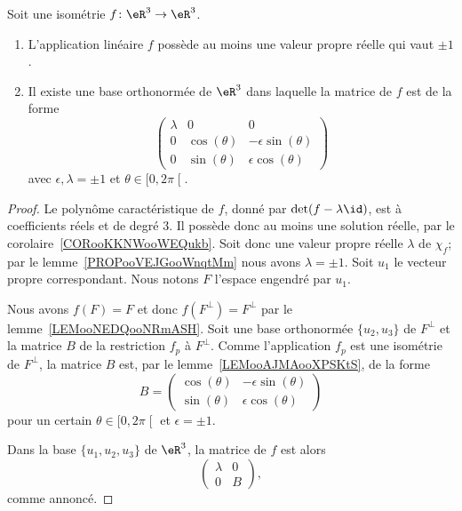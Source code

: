 \begin{proposition}      \label{PROPooOMORooWzsrDB}
	Soit une isométrie \( f\colon \eR^3\to \eR^3\).
	\begin{enumerate}
		\item
		      L'application linéaire \( f\) possède au moins une valeur propre réelle qui vaut \( \pm 1\).
		\item
		      Il existe une base orthonormée de \( \eR^3\) dans laquelle la matrice de \( f\) est de la forme
		      \begin{equation}
			      \begin{pmatrix}
				      \lambda & 0            & 0                     \\
				      0       & \cos(\theta) & -\epsilon\sin(\theta) \\
				      0       & \sin(\theta) & \epsilon\cos(\theta)
			      \end{pmatrix}
		      \end{equation}
		      avec \( \epsilon,\lambda=\pm 1\) et \( \theta\in \mathopen[ 0 , 2\pi \mathclose[\).
	\end{enumerate}
\end{proposition}

\begin{proof}
	Le polynôme caractéristique de \( f\), donné par \( \det(f-\lambda\id)\), est à coefficients réels et de degré \( 3\). Il possède donc au moins une solution réelle, par le corolaire~\ref{CORooKKNWooWEQukb}. Soit donc une valeur propre réelle \( \lambda\) de \( \chi_f\); par le lemme~\ref{PROPooVEJGooWnqtMm} nous avons \( \lambda=\pm 1\). Soit \( u_1\) le vecteur propre correspondant. Nous notons \( F\) l'espace engendré par \( u_1\).

	Nous avons \( f(F)=F\) et donc \( f(F^{\perp})=F^{\perp}\) par le lemme~\ref{LEMooNEDQooNRmASH}. Soit une base orthonormée \( \{ u_2,u_3 \}\) de \( F^{\perp}\) et la matrice \( B\) de la restriction \( f_{p}\) à \( F^{\perp}\). Comme l'application \( f_p\) est une isométrie de \( F^{\perp}\), la matrice \( B\) est, par le lemme~\ref{LEMooAJMAooXPSKtS}, de la forme
	\begin{equation}
		B=\begin{pmatrix}
			\cos(\theta) & -\epsilon\sin(\theta) \\
			\sin(\theta) & \epsilon\cos(\theta)
		\end{pmatrix}
	\end{equation}
	pour un certain \( \theta\in\mathopen[ 0 , 2\pi \mathclose[\) et \( \epsilon=\pm 1\).

	Dans la base \( \{u_1,u_2,u_3\}\) de \( \eR^3\), la matrice de \( f\) est alors
	\begin{equation}
		\begin{pmatrix}
			\lambda & 0 \\
			0       & B
		\end{pmatrix},
	\end{equation}
	comme annoncé.
\end{proof}

